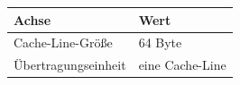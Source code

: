\begin{tabular}{ll}
  \toprule
  Achse & Wert \\
  \midrule
  Cache-Line-Größe & 64 Byte \\
  Übertragungseinheit & eine Cache-Line \\
  \bottomrule
\end{tabular}
